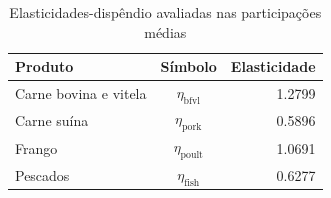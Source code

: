 
\begin{table}[H]
\centering
\caption{Elasticidades-dispêndio avaliadas nas participações médias}
\label{tab:elasticidade-dispendio}
\small
\begin{tabular}{@{}lcr@{}}
\toprule
Produto & Símbolo & Elasticidade \\
\midrule
Carne bovina e vitela & $\eta_{\text{bfvl}}$ & 1.2799 \\
Carne suína & $\eta_{\text{pork}}$ & 0.5896 \\
Frango & $\eta_{\text{poult}}$ & 1.0691 \\
Pescados & $\eta_{\text{fish}}$ & 0.6277 \\
\bottomrule
\end{tabular}
\end{table}
